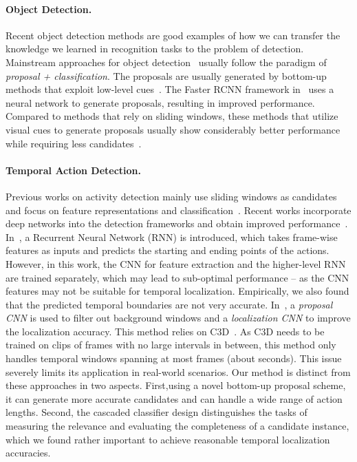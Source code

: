 \documentclass[10pt,twocolumn,letterpaper]{article}
\begin{document}
\vspace{-8pt}
\paragraph{Object Detection.}
Recent object detection methods are good examples of 
how we can transfer the knowledge we learned in recognition tasks to the problem of detection.
Mainstream approaches for object detection~\cite{Girshick2014RCNN,Girshick2015FRCNN,Ren2015FasterRCNN} 
usually follow the paradigm of \emph{proposal + classification}.
The proposals are usually generated by bottom-up methods that exploit low-level cues~\cite{Van2011SS,Dollar2014Edgebox}.
The Faster RCNN framework in~\cite{Ren2015FRCNN} uses a neural network to generate proposals,
resulting in improved performance. 
Compared to methods that rely on sliding windows, these methods that utilize visual cues to generate
proposals usually show considerably better performance while requiring less candidates~\cite{Girshick2014RCNN}.

\vspace{-8pt}
\paragraph{Temporal Action Detection.}
Previous works on activity detection mainly use sliding windows as candidates 
and focus on feature representations and 
classification~\cite{Gaidon2013Actom,Tang2013RightFeature,Oneata2013FV,Mettes2015Bofrag,Yuan2016ScorePyramids}.
Recent works incorporate deep networks into the detection frameworks and obtain improved performance~\cite{Yeung2016FrameGlimpse,Shou2016SCNN}.
In~\cite{Yeung2016FrameGlimpse}, 
a Recurrent Neural Network (RNN) is introduced, which takes frame-wise features as inputs
and predicts the starting and ending points of the actions. 
However, in this work, the CNN for feature extraction and the higher-level RNN are trained separately,
which may lead to sub-optimal performance -- as the CNN features may not be suitable for temporal localization.
Empirically, we also found that the predicted temporal boundaries are not very accurate.
In~\cite{Shou2016SCNN}, a \emph{proposal CNN} is used to filter out background windows 
and a \emph{localization CNN} to improve the localization accuracy.
This method relies on C3D~\cite{Tran15C3D}.
As C3D needs to be trained on clips of  frames with no large intervals in between,
this method only handles temporal windows spanning at most  frames (about  seconds). 
This issue severely limits its application in real-world scenarios.
Our method is distinct from these approaches in two aspects.
First,using a novel bottom-up proposal scheme, it can generate more accurate candidates
and can handle a wide range of action lengths.
Second, the cascaded classifier design distinguishes the tasks of measuring the relevance and evaluating the completeness of a candidate instance, which we found rather important to achieve reasonable temporal localization accuracies.
 
\end{document}
